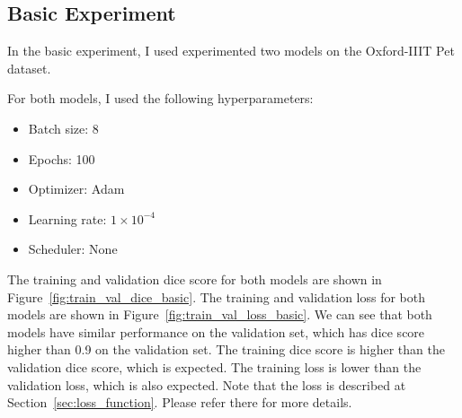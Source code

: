 \subsection{Basic Experiment}

In the basic experiment, I used experimented two models on the Oxford-IIIT Pet dataset.

For both models, I used the following hyperparameters:
\begin{itemize}
    \item Batch size: 8
    \item Epochs: 100
    \item Optimizer: Adam
    \item Learning rate: $1 \times 10^{-4}$
    \item Scheduler: None
\end{itemize}


The training and validation dice score for both models are shown in Figure~\ref{fig:train_val_dice_basic}.
The training and validation loss for both models are shown in Figure~\ref{fig:train_val_loss_basic}.
We can see that both models have similar performance on the validation set, which has dice score higher than 0.9 on the validation set.
The training dice score is higher than the validation dice score, which is expected.
The training loss is lower than the validation loss, which is also expected.
Note that the loss is described at Section~\ref{sec:loss_function}.
Please refer there for more details.

